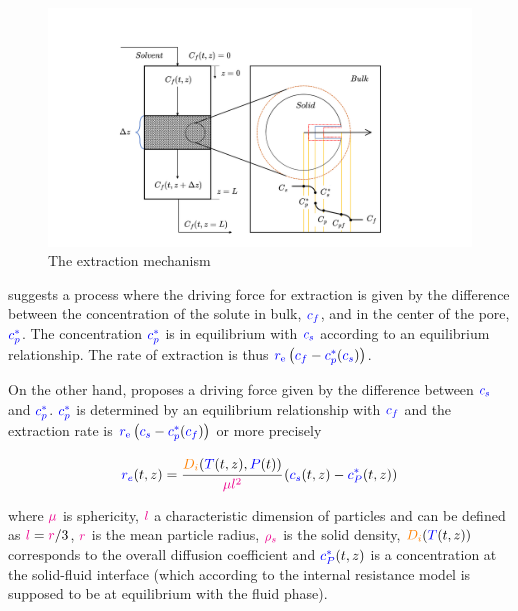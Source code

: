 \documentclass[../Article_Model_Parameters.tex]{subfiles}
\begin{document}
		\begin{figure}[h!]
			\centering
			\includegraphics[trim = 45cm 0cm 60cm 20cm,clip,width=\columnwidth]{Figures/SFE_PFD.drawio.png}	
			\caption{The extraction mechanism}
			\label{fig: SFE_Mechanism}
		\end{figure}
			
		\citet{Bulley1984} suggests a process where the driving force for extraction is given by the difference between the concentration of the solute in bulk, ${\color{blue}c_f}$, and in the center of the pore, ${\color{blue}c_p^*}$. The concentration ${\color{blue}c_p^*}$ is in equilibrium with ${\color{blue}c_s}$ according to an equilibrium relationship. The rate of extraction is thus ${\color{blue}r_\text{e}}\left({\color{blue}c_f} - {\color{blue}c^*_p}({\color{blue}c_s})\right)$.  
			
		On the other hand, \citet{Reverchon1996} proposes a driving force given by the difference between ${\color{blue}c_s}$ and ${\color{blue}c_p^*}$. ${\color{blue}c_p^*}$ is determined by an equilibrium relationship with ${\color{blue}c_f}$ and the extraction rate is ${\color{blue}r_\text{e}}\left({\color{blue}c_s} - {\color{blue}c^*_p}({\color{blue}c_f})\right)$ or more precisely
			
			{\footnotesize
				\begin{equation} \label{Model_kinetic_basic}
					{\color{blue}r_e}(t,z) = \cfrac{{\color{orange}D_i}({\color{blue}T}(t,z), {\color{blue}P}(t))}{{\color{magenta} \mu l^2} }\left({\color{blue}c_s}(t,z) - {\color{blue}c_P^*}(t,z) \right)
			\end{equation} }
			
		where ${\color{magenta}\mu}$ is sphericity, ${\color{magenta}l}$ a characteristic dimension of particles and can be defined as ${\color{magenta}l} = {\color{magenta}r}/3$, ${\color{magenta}r}$ is the mean particle radius, ${\color{magenta}\rho_s}$ is the solid density, ${\color{orange}D_i}({\color{blue}T}(t,z))$ corresponds to the overall diffusion coefficient and ${\color{blue}c_P^*}(t,z)$ is a concentration at the solid-fluid interface (which according to the internal resistance model is supposed to be at equilibrium with the fluid phase). 
			
\end{document}
